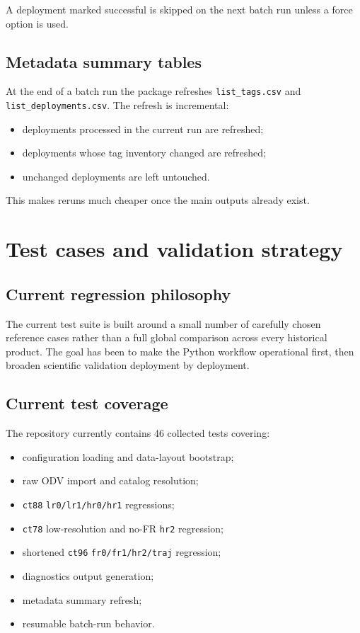 \documentclass[11pt,a4paper]{article}
\newcommand{\pkg}[1]{\texttt{#1}}
\begin{document}
A deployment marked successful is skipped on the next batch run unless a force option is used.

\subsection{Metadata summary tables}

At the end of a batch run the package refreshes \pkg{list\_tags.csv} and \pkg{list\_deployments.csv}. The refresh is incremental:

\begin{itemize}[leftmargin=1.5em]
  \item deployments processed in the current run are refreshed;
  \item deployments whose tag inventory changed are refreshed;
  \item unchanged deployments are left untouched.
\end{itemize}

This makes reruns much cheaper once the main outputs already exist.

\section{Test cases and validation strategy}

\subsection{Current regression philosophy}

The current test suite is built around a small number of carefully chosen reference cases rather than a full global comparison across every historical product. The goal has been to make the Python workflow operational first, then broaden scientific validation deployment by deployment.

\subsection{Current test coverage}

The repository currently contains 46 collected tests covering:

\begin{itemize}[leftmargin=1.5em]
  \item configuration loading and data-layout bootstrap;
  \item raw ODV import and catalog resolution;
  \item \pkg{ct88} \pkg{lr0/lr1/hr0/hr1} regressions;
  \item \pkg{ct78} low-resolution and no-FR \pkg{hr2} regression;
  \item shortened \pkg{ct96} \pkg{fr0/fr1/hr2/traj} regression;
  \item diagnostics output generation;
  \item metadata summary refresh;
  \item resumable batch-run behavior.
\end{itemize}
\end{document}
